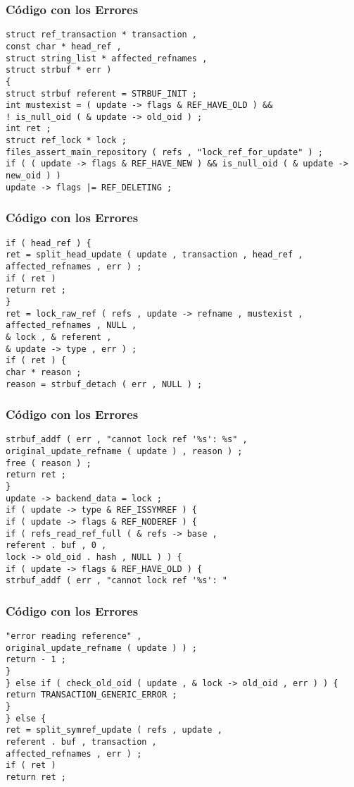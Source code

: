 \documentclass{beamer}
\begin{document}
\begin{frame}[fragile]
\frametitle{C\'odigo con los Errores}
\begin{verbatim}
struct ref_transaction * transaction , 
const char * head_ref , 
struct string_list * affected_refnames , 
struct strbuf * err ) 
{ 
struct strbuf referent = STRBUF_INIT ; 
int mustexist = ( update -> flags & REF_HAVE_OLD ) && 
! is_null_oid ( & update -> old_oid ) ; 
int ret ; 
struct ref_lock * lock ; 
files_assert_main_repository ( refs , "lock_ref_for_update" ) ; 
if ( ( update -> flags & REF_HAVE_NEW ) && is_null_oid ( & update -> new_oid ) ) 
update -> flags |= REF_DELETING ; 
\end{verbatim}
\end{frame}
\begin{frame}[fragile]
\frametitle{C\'odigo con los Errores}
\begin{verbatim}
if ( head_ref ) { 
ret = split_head_update ( update , transaction , head_ref , 
affected_refnames , err ) ; 
if ( ret ) 
return ret ; 
} 
ret = lock_raw_ref ( refs , update -> refname , mustexist , 
affected_refnames , NULL , 
& lock , & referent , 
& update -> type , err ) ; 
if ( ret ) { 
char * reason ; 
reason = strbuf_detach ( err , NULL ) ; 
\end{verbatim}
\end{frame}
\begin{frame}[fragile]
\frametitle{C\'odigo con los Errores}
\begin{verbatim}
strbuf_addf ( err , "cannot lock ref '%s': %s" , 
original_update_refname ( update ) , reason ) ; 
free ( reason ) ; 
return ret ; 
} 
update -> backend_data = lock ; 
if ( update -> type & REF_ISSYMREF ) { 
if ( update -> flags & REF_NODEREF ) { 
if ( refs_read_ref_full ( & refs -> base , 
referent . buf , 0 , 
lock -> old_oid . hash , NULL ) ) { 
if ( update -> flags & REF_HAVE_OLD ) { 
strbuf_addf ( err , "cannot lock ref '%s': " 
\end{verbatim}
\end{frame}
\begin{frame}[fragile]
\frametitle{C\'odigo con los Errores}
\begin{verbatim}
"error reading reference" , 
original_update_refname ( update ) ) ; 
return - 1 ; 
} 
} else if ( check_old_oid ( update , & lock -> old_oid , err ) ) { 
return TRANSACTION_GENERIC_ERROR ; 
} 
} else { 
ret = split_symref_update ( refs , update , 
referent . buf , transaction , 
affected_refnames , err ) ; 
if ( ret ) 
return ret ; 
\end{verbatim}
\end{frame}
\end{document}
